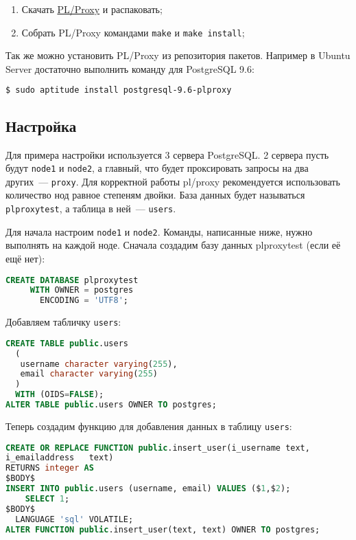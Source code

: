 \begin{enumerate}
  \item Скачать \href{https://github.com/plproxy/plproxy}{PL/Proxy} и распаковать;
  \item Собрать PL/Proxy командами \lstinline!make! и \lstinline!make install!;
\end{enumerate}

Так же можно установить PL/Proxy из репозитория пакетов. Например в Ubuntu Server достаточно выполнить команду для PostgreSQL 9.6:

\begin{lstlisting}[language=Bash,label=lst:plproxy1,caption=Установка]
$ sudo aptitude install postgresql-9.6-plproxy
\end{lstlisting}


\subsection{Настройка}


Для примера настройки используется 3 сервера PostgreSQL. 2 сервера пусть будут \lstinline!node1! и \lstinline!node2!, а главный, что будет проксировать запросы на два других~--- \lstinline!proxy!. Для корректной работы pl/proxy рекомендуется использовать количество нод равное степеням двойки. База данных будет называться \lstinline!plproxytest!, а таблица в ней~--- \lstinline!users!.

Для начала настроим \lstinline!node1! и \lstinline!node2!. Команды, написанные ниже, нужно выполнять на каждой ноде. Сначала создадим базу данных plproxytest (если её ещё нет):

\begin{lstlisting}[language=SQL,label=lst:plproxy2,caption=Настройка]
CREATE DATABASE plproxytest
     WITH OWNER = postgres
       ENCODING = 'UTF8';
\end{lstlisting}

Добавляем табличку \lstinline!users!:

\begin{lstlisting}[language=SQL,label=lst:plproxy3,caption=Настройка]
CREATE TABLE public.users
  (
   username character varying(255),
   email character varying(255)
  )
  WITH (OIDS=FALSE);
ALTER TABLE public.users OWNER TO postgres;
\end{lstlisting}

Теперь создадим функцию для добавления данных в таблицу \lstinline!users!:

\begin{lstlisting}[language=SQL,label=lst:plproxy4,caption=Настройка]
CREATE OR REPLACE FUNCTION public.insert_user(i_username text,
i_emailaddress   text)
RETURNS integer AS
$BODY$
INSERT INTO public.users (username, email) VALUES ($1,$2);
    SELECT 1;
$BODY$
  LANGUAGE 'sql' VOLATILE;
ALTER FUNCTION public.insert_user(text, text) OWNER TO postgres;
\end{lstlisting}

